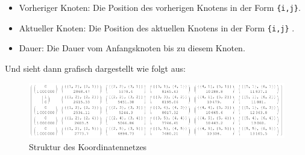 \begin{itemize}
\item Vorheriger Knoten: Die Position des vorherigen Knotens in der Form \texttt{\{i,j\}}.
\item Aktueller Knoten: Die Position des aktuellen Knotens in der Form \texttt{\{i,j\}} .
\item Dauer: Die Dauer vom Anfangsknoten bis zu diesem Knoten.
\end{itemize}
Und sieht dann grafisch dargestellt wie folgt aus:
\begin{figure}[h!]
\centering
\includegraphics[width=1\linewidth]{img/grid_structure}
\caption{Struktur des Koordinatennetzes}
\label{gridnetConn}
\end{figure}

